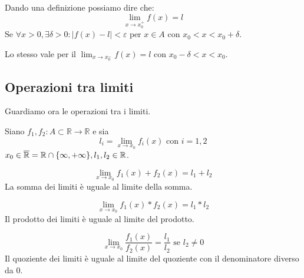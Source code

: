 \begin{definition}
    Dando una definizione possiamo dire che:
    \begin{equation}
        \lim_{x\rightarrow x_0^+}f(x)=l
    \end{equation}
    $\text{Se } \forall x>0, \exists\delta>0:|f(x)-l|<\varepsilon \text{ per } x\in A \text{ con } x_0<x<x_0+\delta$.
    
    Lo stesso vale per il $\lim_{x\rightarrow x_0^-}f(x)=l \text{ con } x_0-\delta<x<x_0$.
\end{definition}


\subsection{Operazioni tra limiti}
Guardiamo ora le operazioni tra i limiti.

\begin{thm}
    Siano $f_1, f_2:A\subset\mathbb{R}\rightarrow\mathbb{R}$ e sia 
    \begin{equation}
        l_i=\lim_{x\to x_0}f_i(x) \text{ con } i=1,2 
    \end{equation}
    $x_0\in\overline{\mathbb{R}}=\mathbb{R}\cap\{\-\infty,+\infty\}, l_1, l_2\in\mathbb{R}$.
\end{thm}

\begin{definition}[Somma]\label{lim:th:somma}
    \begin{equation*}
        \lim_{x\to x_0}f_1(x)+f_2(x)=l_1+l_2    
    \end{equation*}
    La somma dei limiti è uguale al limite della somma.
\end{definition}

\begin{definition}[Prodotto]\label{lim:th:prodotto}
    \begin{equation*}
        \lim_{x\to x_0}f_1(x)*f_2(x)=l_1*l_2    
    \end{equation*}
    Il prodotto dei limiti è uguale al limite del prodotto.
\end{definition}

\begin{definition}[Quoziente]
    \begin{equation*}
        \lim_{x\to x_0}\frac{f_1(x)}{f_2(x)}=\frac{l_1}{l_2} \text{ se } l_2\neq 0
    \end{equation*}
    Il quoziente dei limiti è uguale al limite del quoziente con il denominatore diverso da 0.
\end{definition}

